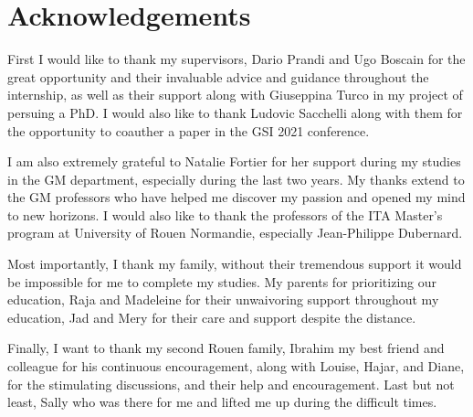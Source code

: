 \documentclass[
  american,
]{article}
\begin{document}
\def\Aut{\mathrm{Aut}}

\def\qtext#1{\quad\text{#1}\quad}

\def\argmin{\mathop{\mathrm{argmin}}}
\def\argmax{\mathop{\mathrm{argmax}}}
\def\supp{\mathop{\mathrm{supp}}}

\def\Re{\mathrm{Re}}
\def\Im{\mathrm{Im}}

\def\transp#1{{#1}^{\top}}

\def\stft #1{\mathrm{STFT}\sset{#1}}
\def\STFT{\mathrm{STFT}}
\def\Proj{\mathrm{Proj}}

\def\Cd{\mathrm{Cauchy}}
\def\Nd{\mathcal{N}}
\def\med{\mathrm{median}}

\pagebreak

\hypertarget{acknowledgements}{%
\section*{Acknowledgements}\label{acknowledgements}}

First I would like to thank my supervisors, Dario Prandi and Ugo Boscain
for the great opportunity and their invaluable advice and guidance throughout the internship,
as well as their support along with Giuseppina Turco in my project of persuing a PhD.
I would also like to thank Ludovic Sacchelli along with them for the opportunity
to coauther a paper in the GSI 2021 conference.

I am also extremely grateful to Natalie Fortier for her support during my studies
in the GM department, especially during the last two years.
My thanks extend to the GM professors who have helped me discover my passion
and opened my mind to new horizons.
I would also like to thank the professors of the ITA Master's program
at University of Rouen Normandie, especially Jean-Philippe Dubernard.

Most importantly, I thank my family, without their tremendous support
it would be impossible for me to complete my studies.
My parents for prioritizing our education, Raja and Madeleine
for their unwaivoring support throughout my education,
Jad and Mery for their care and support despite the distance.

Finally, I want to thank my second Rouen family, Ibrahim
my best friend and colleague for his continuous encouragement,
along with Louise, Hajar, and Diane, for the stimulating discussions,
and their help and encouragement.
Last but not least, Sally who was there for me and lifted me up
during the difficult times.
\end{document}
